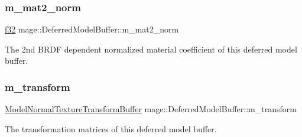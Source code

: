 \subsubsection{\texorpdfstring{m\+\_\+mat2\+\_\+norm}{m\_mat2\_norm}}
{\footnotesize\ttfamily \hyperlink{namespacemage_a6a44ad388483959dc4dff9f2aef91431}{f32} mage\+::\+Deferred\+Model\+Buffer\+::m\+\_\+mat2\+\_\+norm}

The 2nd B\+R\+DF dependent normalized material coefficient of this deferred model buffer. \hypertarget{structmage_1_1_deferred_model_buffer_ae74080deb2222df1e84ffa326016ea8d}{}\label{structmage_1_1_deferred_model_buffer_ae74080deb2222df1e84ffa326016ea8d} 
\subsubsection{\texorpdfstring{m\+\_\+transform}{m\_transform}}
{\footnotesize\ttfamily \hyperlink{structmage_1_1_model_normal_texture_transform_buffer}{Model\+Normal\+Texture\+Transform\+Buffer} mage\+::\+Deferred\+Model\+Buffer\+::m\+\_\+transform}

The transformation matrices of this deferred model buffer. 